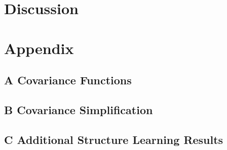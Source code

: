 \documentclass[twoside,11pt]{article}
\newcommand{\gpmem}{\texttt{gpmem}}
\begin{document}

%
%
%
\section{Discussion}


\newpage
\section*{Appendix}
\subsection*{A Covariance Functions}


\subsection*{B Covariance Simplification}


\subsection*{C Additional Structure Learning Results}


\newpage


\end{document}
